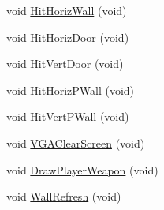 \begin{DoxyCompactItemize}
void \hyperlink{WL__DRAW_8C_a489668c5f832e695224cb9b1022f3448}{HitHorizWall} (void)
\item 
void \hyperlink{WL__DRAW_8C_a5d1512cb6cadbf0425a0592969b0b3ad}{HitHorizDoor} (void)
\item 
void \hyperlink{WL__DRAW_8C_aae630232d435e6ac2f55605b02234738}{HitVertDoor} (void)
\item 
void \hyperlink{WL__DRAW_8C_ad40f149ac1d729c05048070e5e44222c}{HitHorizPWall} (void)
\item 
void \hyperlink{WL__DRAW_8C_a29679cfe78e8257f4b05113f66b6c1a0}{HitVertPWall} (void)
\item 
void \hyperlink{WL__DRAW_8C_a8c59376aa57ff617474480c2456efa3a}{VGAClearScreen} (void)
\item 
void \hyperlink{WL__DRAW_8C_ae3f72ce964ddefe4c1f76a8e31a65cad}{DrawPlayerWeapon} (void)
\item 
void \hyperlink{WL__DRAW_8C_aed0d4f447eabd05ce9d901771d8cf3de}{WallRefresh} (void)
\end{DoxyCompactItemize}
